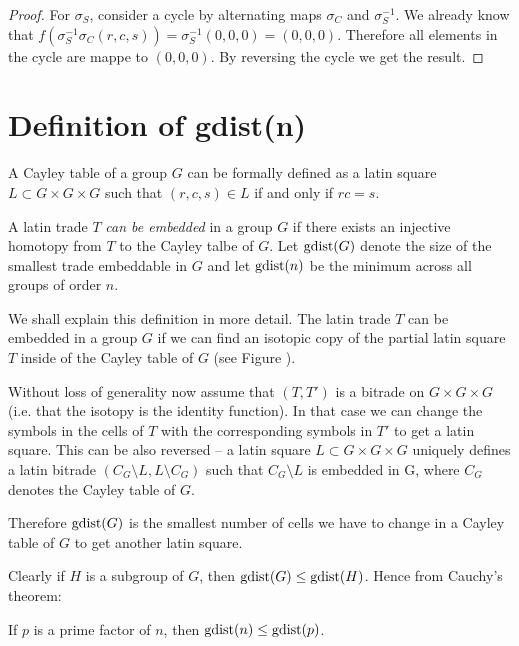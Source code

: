 \begin{proof}
For $\sigma_S$, consider a cycle by alternating maps $\sigma_C$ and $\sigma_S^{-1}$. We already know that $f(\sigma_S^{-1}\sigma_C(r,c,s)) = \sigma_S^{-1}(0,0,0) = (0,0,0)$. Therefore all elements in the cycle are mappe to $(0,0,0)$. By reversing the cycle we get the result.

\end{proof}

\section{Definition of gdist(n)}

A Cayley table of a group $G$ can be formally defined as a latin square $L \subset G \times G \times G$ such that $(r,c,s) \in L$ if and only if $rc = s$.%

\begin{defn}
A latin trade $T$ \emph{can be embedded} in a group $G$ if there exists an injective homotopy from $T$ to the Cayley talbe of $G$. Let \emph{$\mathop{\mathrm{gdist}}(G)$} denote the size of the smallest trade embeddable in $G$ and let \emph{$\mathop{\mathrm{gdist}}(n)$} be the minimum across all groups of order $n$.
\end{defn}

We shall explain this definition in more detail. The latin trade $T$ can be embedded in a group $G$ if we can find an isotopic copy of the partial latin square $T$ inside of the Cayley table of $G$ (see Figure ).

Without loss of generality now assume that $(T,T')$ is a bitrade on $G \times G \times G$  (i.e. that the isotopy is the identity function). In that case we can change the symbols in the cells of $T$ with the corresponding symbols in $T'$ to get a latin square. This can be also reversed -- a latin square $L \subset G \times G \times G$ uniquely defines a latin bitrade $(C_G\setminus L, L\setminus C_G)$ such that $C_G\setminus L$ is embedded in G, where $C_G$ denotes the Cayley table of $G$.

Therefore $\mathop{\mathrm{gdist}}(G)$ is the smallest number of cells we have to change in a Cayley table of $G$ to get another latin square.

\bigskip

Clearly if $H$ is a subgroup of $G$, then $\mathop{\mathrm{gdist}}(G) \leq \mathop{\mathrm{gdist}}(H)$. Hence from Cauchy's theorem:

\begin{lem}
\label{lem:gdist-n-leq-gdist-p}
If $p$ is a prime factor of $n$, then $\mathop{\mathrm{gdist}}(n) \leq \mathop{\mathrm{gdist}}(p)$.
\end{lem}%

